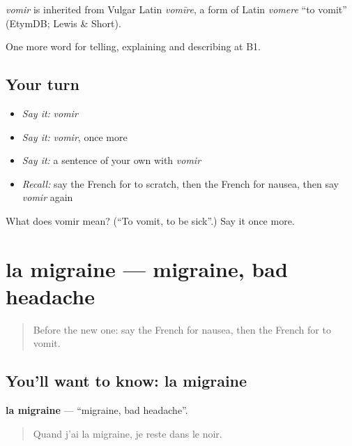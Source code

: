 \begin{cousinweb}
\emph{vomir} is inherited from Vulgar Latin \emph{vomīre}, a form of Latin \emph{vomere} \textquotedblleft{}to vomit\textquotedblright{} (EtymDB; Lewis \& Short).
\end{cousinweb}

\begin{grammarlens}[title={What you've built}]
One more word for telling, explaining and describing at B1.
\end{grammarlens}

\subsection*{Your turn}
\begin{itemize}
\raggedright
  \item \emph{Say it:} \emph{vomir}
  \item \emph{Say it:} \emph{vomir}, once more
  \item \emph{Say it:} a sentence of your own with \emph{vomir}
  \item \emph{Recall:} say the French for to scratch, then the French for nausea, then say \emph{vomir} again
\end{itemize}

\begin{tcolorbox}[breakable,colback=teal!4,colframe=teal!35!black,title={Before you move on}]
What does vomir mean? (\textquotedblleft{}To vomit, to be sick\textquotedblright{}.) Say it once more.
\end{tcolorbox}
\section[la migraine]{la migraine — migraine, bad headache}

\label{lesson:FR-C483-migraine}



\begin{quote}
Before the new one: say the French for nausea, then the French for to vomit.
\end{quote}

\subsection*{You'll want to know: la migraine}
\textbf{la migraine} — \textquotedblleft{}migraine, bad headache\textquotedblright{}.

\begin{quote}
Quand j'ai la migraine, je reste dans le noir.
\end{quote}

